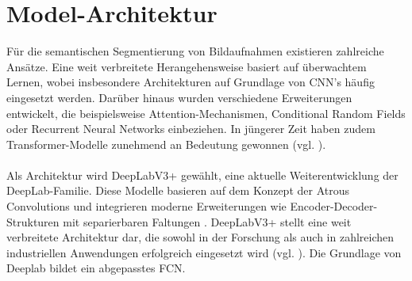 \documentclass[12pt,DIV=15,BCOR=15mm,twoside,headsepline,abstract=true,listof=totoc,bibliography=totoc]{scrreprt}
\theoremstyle{remark}    %
\begin{document}
    \section{Model-Architektur}
    Für die semantischen Segmentierung von Bildaufnahmen existieren zahlreiche Ansätze. Eine weit verbreitete Herangehensweise basiert auf 
    überwachtem Lernen, wobei insbesondere Architekturen auf Grundlage von \ac{CNN}'s häufig eingesetzt werden. Darüber hinaus wurden verschiedene Erweiterungen 
    entwickelt, die beispielsweise Attention-Mechanismen, Conditional Random Fields oder Recurrent Neural Networks einbeziehen. In jüngerer 
    Zeit haben zudem Transformer-Modelle zunehmend an Bedeutung gewonnen (vgl. \cite{csurka2023semanticimagesegmentationdecades,
    zhou2024imagesegmentationfoundationmodel, minaee2020imagesegmentationusingdeep}).\\\\
    Als Architektur wird DeepLabV3+ gewählt, eine aktuelle Weiterentwicklung der DeepLab-Familie. Diese Modelle basieren auf dem Konzept der 
    Atrous Convolutions und integrieren moderne Erweiterungen wie Encoder-Decoder-Strukturen mit separierbaren Faltungen 
    \cite{chen2018encoderdecoderatrousseparableconvolution,chen2017rethinkingatrousconvolutionsemantic}. 
    DeepLabV3+ stellt eine weit verbreitete Architektur dar, die sowohl in der Forschung als auch in 
    zahlreichen industriellen Anwendungen erfolgreich eingesetzt wird (vgl. \cite{csurka2023semanticimagesegmentationdecades, 
    minaee2020imagesegmentationusingdeep}). Die Grundlage von Deeplab bildet ein abgepasstes \ac{FCN}. \\\\
\end{document}
